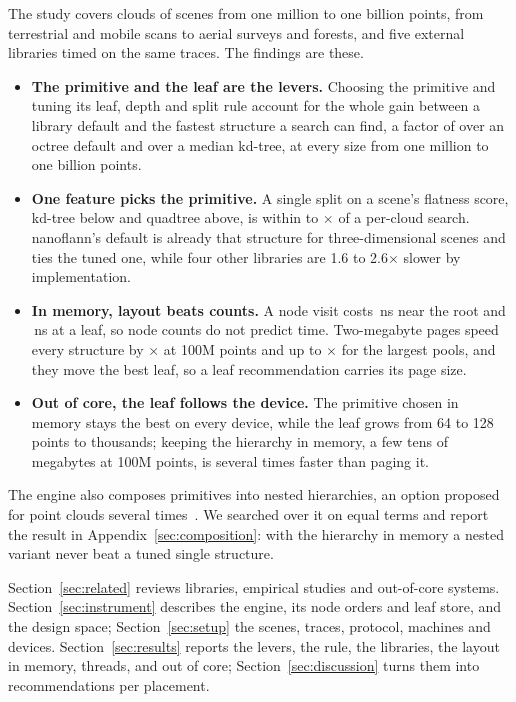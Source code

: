 The study covers \nCells{} clouds of \nScenes{} scenes from one million to one billion points, from terrestrial and mobile scans to aerial surveys and forests, and five external libraries timed on the same traces. The findings are these.
\begin{itemize}[leftmargin=*, itemsep=2pt]
\item \textbf{The primitive and the leaf are the levers.} Choosing the primitive and tuning its leaf, depth and split rule account for the whole gain between a library default and the fastest structure a search can find, a factor of \leverOctreeDefaultTuned{} over an octree default and \leverKdDefaultTuned{} over a median kd-tree, at every size from one million to one billion points.
\item \textbf{One feature picks the primitive.} A single split on a scene's flatness score, kd-tree below and quadtree above, is within  to $\times$ of a per-cloud search. nanoflann's default is already that structure for three-dimensional scenes and ties the tuned one, while four other libraries are 1.6 to 2.6$\times$ slower by implementation.
\item \textbf{In memory, layout beats counts.} A node visit costs \visitCostTopNs\,ns near the root and \visitCostLeafNs\,ns at a leaf, so node counts do not predict time. Two-megabyte pages speed every structure by \hugeSinglesHundredM$\times$ at 100M points and up to \hugeMin$\times$ for the largest pools, and they move the best leaf, so a leaf recommendation carries its page size.
\item \textbf{Out of core, the leaf follows the device.} The primitive chosen in memory stays the best on every device, while the leaf grows from 64 to 128 points to thousands; keeping the hierarchy in memory, a few tens of megabytes at 100M points, is several times faster than paging it.
\end{itemize}

The engine also composes primitives into nested hierarchies, an option proposed for point clouds several times~\cite{wang2021hybridpointcloud,park2021nestedoctree,ogayar2023nestedlidar}. We searched over it on equal terms and report the result in Appendix~\ref{sec:composition}: with the hierarchy in memory a nested variant never beat a tuned single structure.

Section~\ref{sec:related} reviews libraries, empirical studies and out-of-core systems. Section~\ref{sec:instrument} describes the engine, its node orders and leaf store, and the design space; Section~\ref{sec:setup} the scenes, traces, protocol, machines and devices. Section~\ref{sec:results} reports the levers, the rule, the libraries, the layout in memory, threads, and out of core; Section~\ref{sec:discussion} turns them into recommendations per placement.
